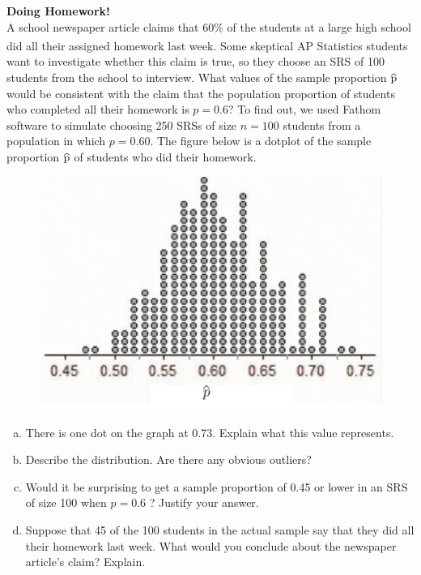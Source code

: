 \documentclass[a4paper, 12pt,twoside]{book}
\newcommand\reallywidehat[1]{%
\savestack{\tmpbox}{\stretchto{%
  \scaleto{%
    \scalerel*[\widthof{\ensuremath{#1}}]{\kern-.6pt\bigwedge\kern-.6pt}%
    {\rule[-\textheight/2]{1ex}{\textheight}}%
  }{\textheight}%
}{0.5ex}}%
\stackon[1pt]{#1}{\tmpbox}%
}
\begin{document}
\noindent \colorbox{champagne}{\parbox{\textwidth}{
\textbf{Doing Homework!}\vspace{0.3cm}\\
 A school newspaper article claims that 60\% of the students at a large high school did all their assigned homework last week. Some skeptical AP\textsuperscript{\textregistered} Statistics students want to investigate whether this claim is true, so they choose an SRS of 100 students from the school to interview. What values of the sample proportion $\reallywidehat{p}$ would be consistent with the claim that the population proportion of students who completed all their homework is $p=0.6$?  To find out, we used Fathom software to simulate choosing 250 SRSs of size $n = 100$ students from a population in which $p = 0.60$. The figure below is a dotplot of the sample proportion $\reallywidehat{p}$ of students who did their homework.
 \begin{figure}[H]
     \centering
     \includegraphics[scale=0.3]{DoingHomework}
 \end{figure}
    \begin{enumerate}[(a)]
        \item There is one dot on the graph at 0.73. Explain what this value represents.
        \item Describe the distribution. Are there any obvious outliers?
        \item  Would it be surprising to get a sample proportion of 0.45 or lower in an SRS of size 100 when $p = 0.6$ ? Justify your answer.
        \item  Suppose that 45 of the 100 students in the actual sample say that they did all their homework last week. What would you conclude about the newspaper article’s claim? Explain.
    \end{enumerate}
}}
\newpage
\end{document}
